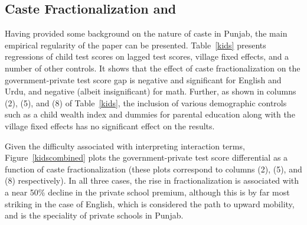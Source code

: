 \documentclass[12pt]{article}
\begin{document}




\subsection{Caste Fractionalization and }\label{mainfinding}
Having provided some background on the nature of caste in Punjab, the main empirical regularity of the paper can be presented. Table~\ref{kids} presents regressions of child test scores on lagged test scores, village fixed effects, and a number of other controls. It shows that the effect of caste fractionalization on the government-private test score gap is negative and significant for English and Urdu, and negative (albeit insignificant) for math. Further, as shown in columns (2), (5), and (8) of Table~\ref{kids}, the inclusion of various demographic controls such as a child wealth index and dummies for parental education along with the village fixed effects has no significant effect on the results. 

Given the difficulty associated with interpreting interaction terms, Figure~\ref{kidscombined} plots the government-private test score differential as a function of caste fractionalization (these plots correspond to columns (2), (5), and (8) respectively). In all three cases, the rise in fractionalization is associated with a near 50\% decline in the private school premium, although this is by far most striking in the case of English, which is considered the path to upward mobility, and is the speciality of private schools in Punjab. 
\end{document}
